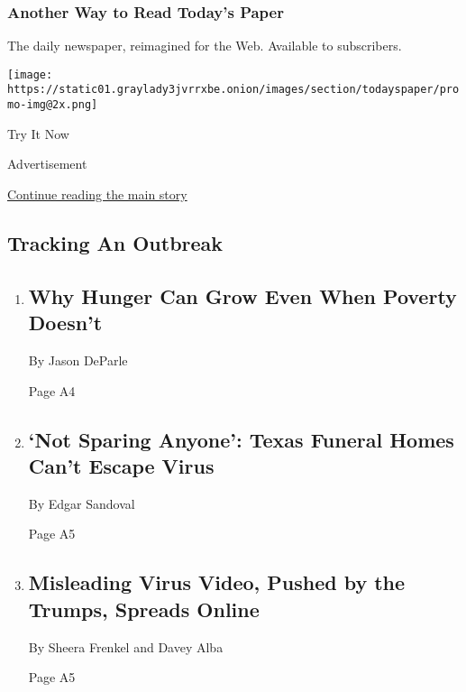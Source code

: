 \href{http://app.nytimes3xbfgragh.onion/todayspaper}{}

\hypertarget{another-way-to-read-todays-paper}{%
\subsubsection{Another Way to Read Today's
Paper}\label{another-way-to-read-todays-paper}}

The daily newspaper, reimagined for the Web. Available to subscribers.

\texttt{[image: https://static01.graylady3jvrrxbe.onion/images/section/todayspaper/promo-img@2x.png]}

Try It Now

Advertisement

\protect\hyperlink{after-mid1}{Continue reading the main story}

\hypertarget{tracking-an-outbreak}{%
\subsection{Tracking An Outbreak}\label{tracking-an-outbreak}}

\begin{enumerate}
\def\labelenumi{\arabic{enumi}.}
\item
  \href{/2020/07/28/us/politics/coronavirus-hunger-poverty.html}{}

  \hypertarget{why-hunger-can-grow-even-when-poverty-doesnt}{%
  \subsection{Why Hunger Can Grow Even When Poverty
  Doesn't}\label{why-hunger-can-grow-even-when-poverty-doesnt}}

  By Jason DeParle

  Page A4
\item
  \href{/2020/07/28/us/coronavirus-texas-funeral-homes.html}{}

  \hypertarget{not-sparing-anyone-texas-funeral-homes-cant-escape-virus-1}{%
  \subsection{`Not Sparing Anyone': Texas Funeral Homes Can't Escape
  Virus}\label{not-sparing-anyone-texas-funeral-homes-cant-escape-virus-1}}

  By Edgar Sandoval

  Page A5
\item
  \href{/2020/07/28/technology/virus-video-trump.html}{}

  \hypertarget{misleading-virus-video-pushed-by-the-trumps-spreads-online-1}{%
  \subsection{Misleading Virus Video, Pushed by the Trumps, Spreads
  Online}\label{misleading-virus-video-pushed-by-the-trumps-spreads-online-1}}

  By Sheera Frenkel and Davey Alba

  Page A5
\end{enumerate}

